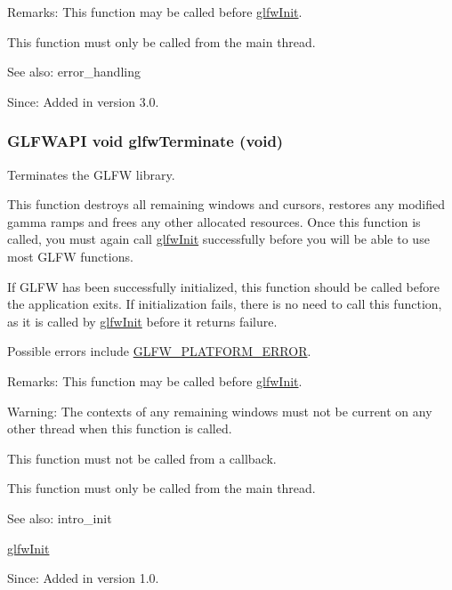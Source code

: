 \begin{Desc}
\item[Remarks:]This function may be called before \hyperlink{group__init_gb41771f0215a2e0afb4cf1cf98082d40}{glfwInit}.\end{Desc}
This function must only be called from the main thread.

\begin{Desc}
\item[See also:]error\_\-handling\end{Desc}
\begin{Desc}
\item[Since:]Added in version 3.0. \end{Desc}
\hypertarget{group__init_gfd90e6fd4819ea9e22e5e739519a6504}{
\subsubsection[glfwTerminate]{\setlength{\rightskip}{0pt plus 5cm}GLFWAPI void glfwTerminate (void)}}
\label{group__init_gfd90e6fd4819ea9e22e5e739519a6504}


Terminates the GLFW library. 

This function destroys all remaining windows and cursors, restores any modified gamma ramps and frees any other allocated resources. Once this function is called, you must again call \hyperlink{group__init_gb41771f0215a2e0afb4cf1cf98082d40}{glfwInit} successfully before you will be able to use most GLFW functions.

If GLFW has been successfully initialized, this function should be called before the application exits. If initialization fails, there is no need to call this function, as it is called by \hyperlink{group__init_gb41771f0215a2e0afb4cf1cf98082d40}{glfwInit} before it returns failure.

Possible errors include \hyperlink{group__errors_gd44162d78100ea5e87cdd38426b8c7a1}{GLFW\_\-PLATFORM\_\-ERROR}.

\begin{Desc}
\item[Remarks:]This function may be called before \hyperlink{group__init_gb41771f0215a2e0afb4cf1cf98082d40}{glfwInit}.\end{Desc}
\begin{Desc}
\item[Warning:]The contexts of any remaining windows must not be current on any other thread when this function is called.\end{Desc}
This function must not be called from a callback.

This function must only be called from the main thread.

\begin{Desc}
\item[See also:]intro\_\-init 

\hyperlink{group__init_gb41771f0215a2e0afb4cf1cf98082d40}{glfwInit}\end{Desc}
\begin{Desc}
\item[Since:]Added in version 1.0. \end{Desc}
